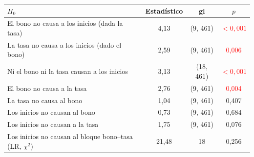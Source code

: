 \begin{tabular}{lccc}
\toprule
$H_0$ & Estad\'istico & gl & $p$
\\ \midrule
El bono no causa a los inicios (dada la tasa) & 4{,}13 & (9, 461) & \textcolor{red}{\ensuremath{<0{,}001}} \\
La tasa no causa a los inicios (dado el bono) & 2{,}59 & (9, 461) & \textcolor{red}{0{,}006} \\
Ni el bono ni la tasa causan a los inicios & 3{,}13 & (18, 461) & \textcolor{red}{\ensuremath{<0{,}001}} \\
El bono no causa a la tasa & 2{,}76 & (9, 461) & \textcolor{red}{0{,}004} \\
La tasa no causa al bono & 1{,}04 & (9, 461) & 0{,}407 \\
Los inicios no causan al bono & 0{,}73 & (9, 461) & 0{,}684 \\
Los inicios no causan a la tasa & 1{,}75 & (9, 461) & 0{,}076 \\
Los inicios no causan al bloque bono--tasa (LR, $\chi^2$) & 21{,}48 & 18 & 0{,}256 \\
\bottomrule
\end{tabular}
